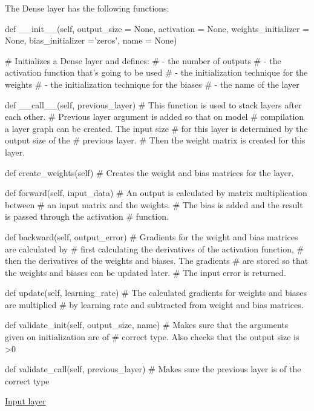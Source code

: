 \documentclass{article}
\begin{document}
    The Dense layer has the following functions:
\begin{python}
def __init__(self,
             output_size         = None,
             activation          = None,
             weights_initializer = None,
             bias_initializer    ='zeros',
             name                = None)

# Initializes a Dense layer and defines:
#       - the number of outputs
#       - the activation function that's going to be used
#       - the initialization technique for the weights
#       - the initialization technique for the biases
#       - the name of the layer
\end{python}
\begin{python}
def __call__(self,
             previous_layer)
# This function is used to stack layers after each other.
# Previous layer argument is added so that on model 
# compilation a layer graph can be created. The input size 
# for this layer is determined by the output size of the 
# previous layer.
# Then the weight matrix is created for this layer.
\end{python}
\begin{python}
def create_weights(self)
# Creates the weight and bias matrices for the layer.
\end{python}
\begin{python}
def forward(self,
            input_data)
# An output is calculated by matrix multiplication between
# an input matrix  and the weights.
# The bias is added and the result is passed through the activation 
# function.
\end{python}
\begin{python}
def backward(self,
             output_error)
# Gradients for the weight and bias matrices are calculated by
# first calculating the derivatives of the activation function,
# then the derivatives of the weights and biases. The gradients 
# are stored so that the weights and biases can be updated later.
# The input error is returned.
\end{python}
\begin{python}
def update(self,
           learning_rate)
# The calculated gradients for weights and biases are multiplied
# by learning rate and subtracted from weight and bias matrices.
\end{python}
\pagebreak
\begin{python}
def validate_init(self,
                  output_size,
                  name)
# Makes sure that the arguments given on initialization are of 
# correct type. Also checks that the output size is >0
\end{python}
\begin{python}
def validate_call(self,
                  previous_layer)
# Makes sure the previous layer is of the correct type                
\end{python}
\clearpage
\hypertarget{input_layer}{\underline{Input layer}} \\
\end{document}
